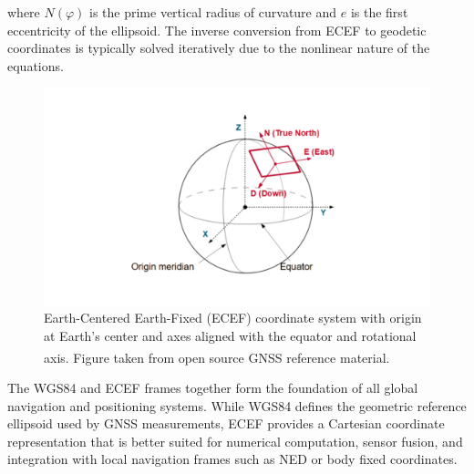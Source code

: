 where $N(\varphi)$ is the prime vertical radius of curvature and $e$ is the first eccentricity of the ellipsoid. The inverse conversion from ECEF to geodetic coordinates is typically solved iteratively due to the nonlinear nature of the equations.
\begin{figure}[H]
    \centering
    \includegraphics[width=0.9\linewidth]{Pictures/System_Modeling/Reference_Frames_and_Transformations/ECEF.png}
    \caption{Earth-Centered Earth-Fixed (ECEF) coordinate system with origin at Earth's center and axes aligned with the equator and rotational axis. Figure taken from open source GNSS reference material.\textsuperscript{\cite{ECEF}}}
    \label{fig:ecef-frame}
\end{figure}
\noindent
The WGS84 and ECEF frames together form the foundation of all global navigation and positioning systems. While WGS84 defines the geometric reference ellipsoid used by GNSS measurements, ECEF provides a Cartesian coordinate representation that is better suited for numerical computation, sensor fusion, and integration with local navigation frames such as NED or body fixed coordinates.



